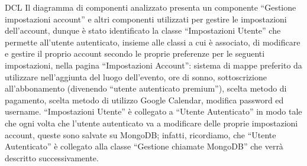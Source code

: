 \begin{listaPersonale}{DCL}
    Il diagramma di componenti analizzato presenta un componente “Gestione impostazioni account” e altri componenti utilizzati per gestire le impostazioni dell'account, dunque è stato identificato la classe “Impostazioni Utente” che permette all'utente autenticato, insieme alle classi a cui è associato, di modificare e gestire il proprio account secondo le proprie preferenze per le seguenti impostazioni, nella pagina “Impostazioni Account”: sistema di mappe preferito da utilizzare nell'aggiunta del luogo dell'evento, ore di sonno, sottoscrizione all'abbonamento (divenendo “utente autenticato premium”), scelta metodo di pagamento, scelta metodo di utilizzo Google Calendar, modifica password ed username.
    “Impostazioni Utente” è collegato a “Utente Autenticato” in modo tale che ogni volta che l'utente autenticato va a modificare delle proprie impostazioni account, queste sono salvate su MongoDB; infatti, ricordiamo, che “Utente Autenticato” è collegato alla classe “Gestione chiamate MongoDB” che verrà descritto successivamente.
    \begin{comment}
        \begin{center}
            \\
            \blfootnote{Immagine \href{https://github.com/Life-planner/Documentazione/blob/main/D3/img/Diagrammi/png/path/to/img.png}{PNG}/\href{https://github.com/Life-planner/Documentazione/blob/main/D3/img/Diagrammi/svg/path/to/img.svg}{SVG} nome file}
        \end{center}
    \end{comment}


    \begin{listaPersonale2}[DCL]{}


\end{listaPersonale2}
\end{listaPersonale}
